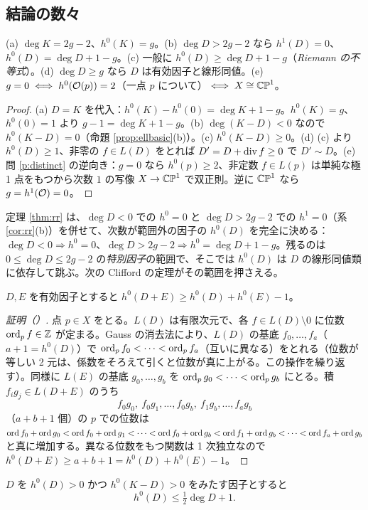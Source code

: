 \subsection{結論の数々}
\begin{cor}\label{cor:rr}
(a) $\deg K=2g-2$、$h^0(K)=g$。(b) $\deg D>2g-2$ なら $h^1(D)=0$、$h^0(D)=\deg D+1-g$。(c) 一般に $h^0(D)\ge\deg D+1-g$（\emph{Riemann の不等式}）。(d) $\deg D\ge g$ なら $D$ は有効因子と線形同値。(e) $g=0\iff h^0(\mathcal O(p))=2$（一点 $p$ について）$\iff X\cong\mathbb{CP}^1$。
\end{cor}
\begin{proof}
(a) $D=K$ を代入：$h^0(K)-h^0(0)=\deg K+1-g$。$h^0(K)=g$、$h^0(0)=1$ より $g-1=\deg K+1-g$。(b) $\deg(K-D)<0$ なので $h^0(K-D)=0$（命題 \ref{prop:ellbasic}(b)）。(c) $h^0(K-D)\ge0$。(d) (c) より $h^0(D)\ge1$、非零の $f\in L(D)$ をとれば $D'=D+\operatorname{div} f\ge0$ で $D'\sim D$。(e) 問 \ref{p:distinct} の逆向き：$g=0$ なら $h^0(p)\ge2$、非定数 $f\in L(p)$ は単純な極 1 点をもつから次数 $1$ の写像 $X\to\mathbb{CP}^1$ で双正則。逆に $\mathbb{CP}^1$ なら $g=h^1(\mathcal O)=0$。
\end{proof}
定理 \ref{thm:rr} は、$\deg D<0$ での $h^0=0$ と $\deg D>2g-2$ での $h^1=0$（系 \ref{cor:rr}(b)）を併せて、次数が範囲外の因子の $h^0(D)$ を完全に決める：$\deg D<0\Rightarrow h^0=0$、$\deg D>2g-2\Rightarrow h^0=\deg D+1-g$。残るのは $0\le\deg D\le2g-2$ の\emph{特別因子}の範囲で、そこでは $h^0(D)$ は $D$ の線形同値類に依存して跳ぶ。次の Clifford の定理がその範囲を押さえる。
\begin{lem}\label{lem:hopf}
$D,E$ を有効因子とすると $h^0(D+E)\ge h^0(D)+h^0(E)-1$。
\end{lem}
\begin{proof}[証明（\tP）]
点 $p\in X$ をとる。$L(D)$ は有限次元で、各 $f\in L(D)\setminus0$ に位数 $\operatorname{ord}_pf\in\mathbb Z$ が定まる。Gauss の消去法により、$L(D)$ の基底 $f_0,\dots,f_a$（$a+1=h^0(D)$）で $\operatorname{ord}_pf_0<\dots<\operatorname{ord}_pf_a$（互いに異なる）をとれる（位数が等しい 2 元は、係数をそろえて引くと位数が真に上がる。この操作を繰り返す）。同様に $L(E)$ の基底 $g_0,\dots,g_b$ を $\operatorname{ord}_pg_0<\dots<\operatorname{ord}_pg_b$ にとる。積 $f_ig_j\in L(D+E)$ のうち
\[
f_0g_0,\ f_0g_1,\dots,f_0g_b,\ f_1g_b,\dots,f_ag_b
\]
（$a+b+1$ 個）の $p$ での位数は $\operatorname{ord} f_0+\operatorname{ord} g_0<\operatorname{ord} f_0+\operatorname{ord} g_1<\dots<\operatorname{ord} f_0+\operatorname{ord} g_b<\operatorname{ord} f_1+\operatorname{ord} g_b<\dots<\operatorname{ord} f_a+\operatorname{ord} g_b$ と真に増加する。異なる位数をもつ関数は 1 次独立なので $h^0(D+E)\ge a+b+1=h^0(D)+h^0(E)-1$。
\end{proof}
\begin{thm}[Clifford]\label{thm:clifford}
$D$ を $h^0(D)>0$ かつ $h^0(K-D)>0$ をみたす因子とすると
\[
h^0(D)\le\tfrac12\deg D+1 .
\]
\end{thm}
